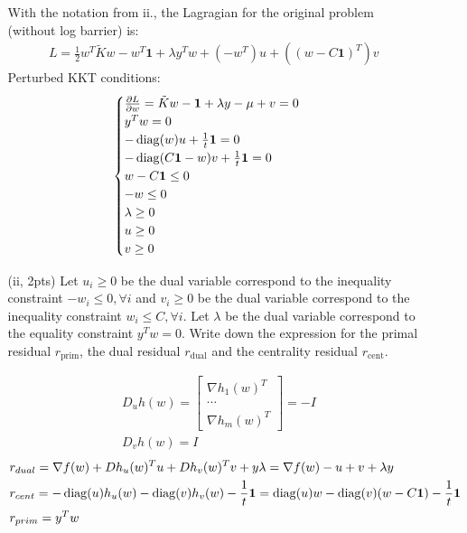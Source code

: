 \documentclass{article}
\theoremstyle{remark}
\theoremstyle{definition}
\newcommand{\diag}{\mathop{\rm diag}}
\begin{document}
\begin{enumerate}[(a)]
\begin{enumerate}[(i)]
      {
      \color{blue}
      
      With the notation from ii., the Lagragian for the original problem (without log barrier) is:
      \begin{align*}
          L = \frac{1}{2}w^T \tilde{K} w - w^T \mathbf{1} + \lambda y^T w + (-w^T)u + ((w-C\mathbf{1})^T)v
      \end{align*}
      Perturbed KKT conditions:
      \begin{align*}
          \begin{cases}
          \frac{\partial L}{\partial w}=\tilde{K}w-\mathbf{1}+\lambda y-\mu +v = 0 \\
          y^T w = 0 \\
          -\diag (w)u + \frac{1}{t}\mathbf{1} = 0 \\
          -\diag (C\mathbf{1}-w)v + \frac{1}{t}\mathbf{1} = 0 \\
          w-C\mathbf{1}\leq 0 \\
          -w \leq 0 \\
          \lambda \geq 0 \\
          u\geq 0 \\
          v\geq 0
          \end{cases}
      \end{align*}
      }

        \item[(ii, 2pts)] Let $u_i \geq 0$ be the dual variable correspond to the inequality constraint $-w_i \leq 0, \forall i$ and $v_i\geq 0$ be the dual variable correspond to the inequality constraint $w_i\leq C, \forall i$. Let $\lambda$ be the dual variable correspond to the equality constraint $y^Tw = 0$. Write down the expression for the primal residual $r_{\text{prim}}$, the dual residual $r_{\text{dual}}$ and the centrality residual $r_{\text{cent}}$.
        
        {
        \color{blue}
        \begin{align*}
            &D_u h(w) = 
            \begin{bmatrix}
            \nabla h_1(w)^T \\
            \cdots \\
            \nabla h_m(w)^T
            \end{bmatrix} = 
            -I \\
            &D_v h(w) = I
        \end{align*}
        \begin{align*}
            &r_{dual} = \nabla f(w) + Dh_u(w)^T u + Dh_v(w)^T v + y\lambda = \nabla f(w) - u + v + \lambda y \\
            &r_{cent} = -\diag(u)h_u(w)-\diag(v)h_v(w)-\frac{1}{t}\mathbf{1}=\diag(u)w-\diag(v)(w-C\mathbf{1})-\frac{1}{t}\mathbf{1} \\
            &r_{prim} = y^T w
        \end{align*}
        }


\end{enumerate}
\end{enumerate}
\end{document}
